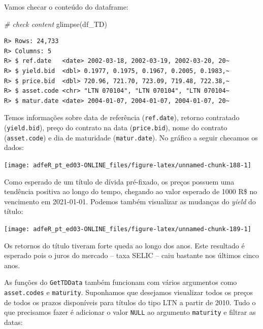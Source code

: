\documentclass[
  11pt,
]{book}
\newenvironment{Shaded}{\begin{snugshade}}{\end{snugshade}}
\newcommand{\CommentTok}[1]{\textcolor[rgb]{0.37,0.37,0.37}{\textit{#1}}}
\newcommand{\FunctionTok}[1]{\textcolor[rgb]{0,0,0}{#1}}
\newcommand{\NormalTok}[1]{#1}
\begin{document}
Vamos checar o conteúdo do dataframe:

\begin{Shaded}
\begin{Highlighting}[]
\CommentTok{\# check content}
\FunctionTok{glimpse}\NormalTok{(df\_TD)}
\end{Highlighting}
\end{Shaded}

\begin{verbatim}
R> Rows: 24,733
R> Columns: 5
R> $ ref.date   <date> 2002-03-18, 2002-03-19, 2002-03-20, 20~
R> $ yield.bid  <dbl> 0.1977, 0.1975, 0.1967, 0.2005, 0.1983,~
R> $ price.bid  <dbl> 720.96, 721.70, 723.09, 719.48, 722.38,~
R> $ asset.code <chr> "LTN 070104", "LTN 070104", "LTN 070104~
R> $ matur.date <date> 2004-01-07, 2004-01-07, 2004-01-07, 20~
\end{verbatim}

Temos informações sobre data de referência (\texttt{ref.date}), retorno contratado (\texttt{yield.bid}), preço do contrato na data (\texttt{price.bid}), nome do contrato (\texttt{asset.code}) e dia de maturidade (\texttt{matur.date}). No gráfico a seguir checamos os dados:

\begin{center}\texttt{[image: adfeR\_pt\_ed03-ONLINE\_files/figure-latex/unnamed-chunk-188-1]} \end{center}

Como esperado de um título de dívida pré-fixado, os preços possuem uma tendência positiva ao longo do tempo, chegando ao valor esperado de 1000 R\$ no vencimento em 2021-01-01. Podemos também visualizar as mudanças do \emph{yield} do título:

\begin{center}\texttt{[image: adfeR\_pt\_ed03-ONLINE\_files/figure-latex/unnamed-chunk-189-1]} \end{center}

Os retornos do título tiveram forte queda ao longo dos anos. Este resultado é esperado pois o juros do mercado -- taxa SELIC -- caiu bastante nos últimos cinco anos.

As funções do \texttt{GetTDData} também funcionam com vários argumentos como \texttt{asset.codes} e \texttt{maturity}. Suponhamos que desejamos visualizar todos os preços de todos os prazos disponíveis para títulos do tipo LTN a partir de 2010. Tudo o que precisamos fazer é adicionar o valor \texttt{NULL} ao argumento \texttt{maturity} e filtrar as datas:
\end{document}
